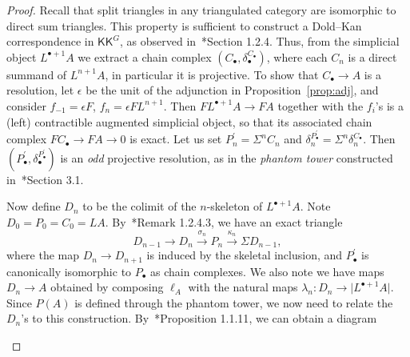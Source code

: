 \documentclass[a4paper,reqno]{amsart}
\theoremstyle{plain}
\theoremstyle{definition}
\theoremstyle{remark}
\numberwithin{equation}{section}
\newcommand{\icKK}{\mathsf{KK}}
\newcommand{\gr}[1]{\lvert #1\rvert}
\begin{document}
\begin{proof}
Recall that split triangles in any triangulated category are isomorphic to direct sum triangles. This property is sufficient to construct a Dold--Kan correspondence in $\icKK^G$, as observed in~\cite{lur:ha}*{Section 1.2.4}. Thus, from the simplicial object $L^{\bullet+1} A$ we extract a chain complex $(C_\bullet,\delta_\bullet^{C_\bullet})$, where each $C_n$ is a direct summand of $L^{n+1}A$, in particular it is projective. To show that $C_\bullet\to A$ is a resolution, let $\epsilon$ be the unit of the adjunction in Proposition~\ref{prop:adj}, and consider $f_{-1}=\epsilon F$, $f_n=\epsilon FL^{n+1}$. Then $FL^{\bullet+1} A\to FA$ together with the $f_i$'s is a (left) contractible augmented simplicial object, so that its associated chain complex $FC_\bullet\to FA\to 0$ is exact. Let us set $P^\prime_n=\Sigma^n C_n$ and $\delta^{P^\prime_\bullet}_n=\Sigma^n \delta^{C_\bullet}_n$. Then $(P^\prime_\bullet,\delta^{P^\prime_\bullet}_\bullet)$ is an \emph{odd} projective resolution, as in the \emph{phantom tower} constructed in~\cite{mey:two}*{Section 3.1}. 

Now define $D_n$ to be the colimit of the $n$-skeleton of $L^{\bullet+1} A$. Note $D_0=P_0=C_0= LA$. By~\cite{lur:ha}*{Remark 1.2.4.3}, we have an exact triangle
\begin{equation*}%
D_{n-1}\to D_{n}\xrightarrow{\sigma_n} P_{n}\xrightarrow{\kappa_{n}} \Sigma D_{n-1},
\end{equation*}
where the map $D_n\to D_{n+1}$ is induced by the skeletal inclusion, and $P^\prime_\bullet$ is canonically isomorphic to $P_\bullet$ as chain complexes. We also note we have maps $D_n\to A$ obtained by composing $\ell_A$ with the natural maps $\lambda_n\colon D_n\to \gr{L^{\bullet+1} A}$. Since $P(A)$ is defined through the phantom tower, we now need to relate the $D_n$'s to this construction. By~\cite{bbd:fais}*{Proposition 1.1.11}, we can obtain a diagram
\begin{center}
  

\end{center}
\end{proof}
\end{document}
